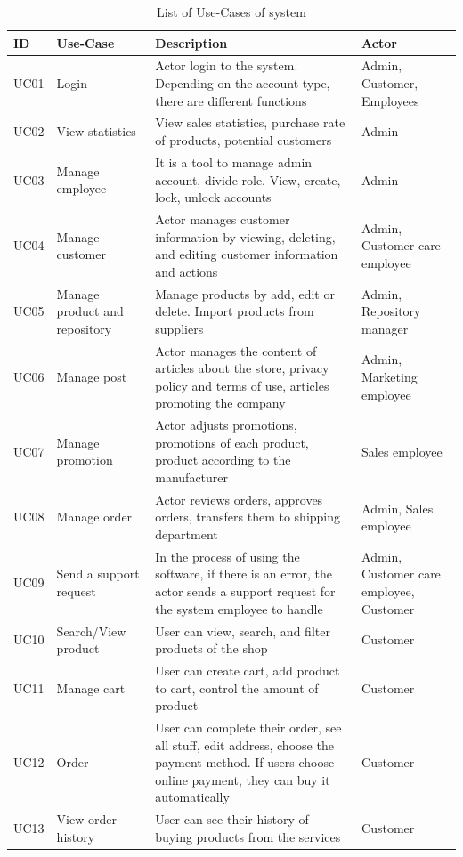\begin{table}
\begin{tabular}{|>{\raggedright\arraybackslash}p{1cm}|>{\raggedright\arraybackslash}p{3cm}|>{\raggedright\arraybackslash}p{8cm}|>{\raggedright\arraybackslash}p{3cm}|}
\hline
\textbf{ID}& \textbf{Use-Case}& \textbf{Description}& \textbf{Actor}\\
\hline
UC01& Login& Actor login to the system. Depending on the account type, there are different functions& Admin, Customer, Employees \\
\hline
UC02& View statistics& View sales statistics, purchase rate of products, potential customers& Admin\\
\hline
UC03& Manage employee& It is a tool to manage admin account, divide role.
View, create, lock, unlock accounts& Admin\\
\hline
UC04& Manage customer& Actor manages customer information by viewing, deleting, and editing customer information and actions& Admin, Customer care employee\\
\hline
UC05& Manage product and repository& Manage products by add, edit or delete. Import products from suppliers& Admin, Repository manager\\
\hline
UC06& Manage post& Actor manages the content of articles about the store, privacy policy and terms of use, articles promoting the company& Admin, Marketing employee\\
\hline 
UC07& Manage promotion& Actor adjusts promotions, promotions of each product, product according to the manufacturer& Sales employee\\
\hline
UC08& Manage order& Actor reviews orders, approves orders, transfers them to shipping department& Admin, Sales employee\\
\hline
UC09& Send a support request& In the process of using the software, if there is an error, the actor sends a support request for the system employee to handle& Admin, Customer care employee, Customer\\
\hline
UC10& Search/View product& User can view, search, and filter products of the shop& Customer\\
\hline
UC11& Manage cart& User can create cart, add product to cart, control the
amount of product& Customer \\
\hline
UC12& Order& User can complete their order, see all stuff, edit address,
choose the payment method. If users choose online
payment, they can buy it automatically& Customer\\
\hline 
UC13& View order history& User can see their history of buying products from the
services& Customer\\
\hline 
\end{tabular}
\caption{List of Use-Cases of system}
\label{tab:use-cases}
\end{table}




